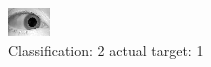 \begin{figure}[h!]
\begin{center}
\includegraphics[width=0.60\columnwidth]{figures/ID1494_class_2_target_1.png}
\end{center}
\caption{ Classification: 2 actual target: 1}
\label{fig:ID1494_class_2_target_1}
\end{figure}

